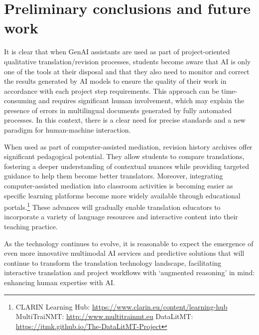 \documentclass[output=paper]{langscibook}
\begin{document}
\section{Preliminary conclusions and future work}\label{sec:8:5}
It is clear that when GenAI assistants are used as part of project-oriented qualitative translation/revision processes, students become aware that AI is only one of the tools at their disposal and that they also need to monitor and correct the results generated by AI models to ensure the quality of their work in accordance with each project step requirements. This approach can be time-consuming and requires significant human involvement, which may explain the presence of errors in multilingual documents generated by fully automated processes. In this context, there is a clear need for precise standards and a new paradigm for human-machine interaction. 

When used as part of computer-assisted mediation, revision history archives offer significant pedagogical potential. They allow students to compare translations, fostering a deeper understanding of contextual nuances while providing targeted guidance to help them become better translators. Moreover, integrating computer-assisted mediation into classroom activities is becoming easier as specific learning platforms become more widely available through educational portals.\footnote{CLARIN Learning Hub: \url{https://www.clarin.eu/content/learning-hub} MultiTraiNMT: \url{http://www.multitrainmt.eu} DataLitMT: \url{https://itmk.github.io/The-DataLitMT-Project}} These advances will gradually enable translation educators to incorporate a variety of language resources and interactive content into their teaching practice.

As the technology continues to evolve, it is reasonable to expect the emergence of even more innovative multimodal AI services and predictive solutions that will continue to transform the translation technology landscape, facilitating interactive translation and project workflows with ‘augmented reasoning’ in mind: enhancing human expertise with AI.

\sloppy\printbibliography[heading=subbibliography,notkeyword=this]
\end{document}
